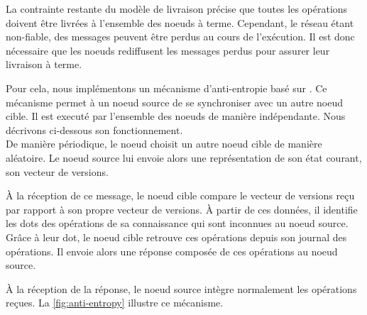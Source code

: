 \label{sec:mute-anti-entropy}

La contrainte restante du modèle de livraison précise que toutes les opérations doivent être livrées à l'ensemble des noeuds à terme.
Cependant, le réseau étant non-fiable, des messages peuvent être perdus au cours de l'exécution.
Il est donc nécessaire que les noeuds rediffusent les messages perdus pour assurer leur livraison à terme.

Pour cela, nous implémentons un mécanisme d'anti-entropie basé sur \cite{1983-anti-entropy-vv}.
Ce mécanisme permet à un noeud source de se synchroniser avec un autre noeud cible.
Il est executé par l'ensemble des noeuds de manière indépendante.
Nous décrivons ci-dessous son fonctionnement.\\

De manière périodique, le noeud choisit un autre noeud cible de manière aléatoire.
Le noeud source lui envoie alors une représentation de son état courant, \ie son vecteur de versions.

À la réception de ce message, le noeud cible compare le vecteur de versions reçu par rapport à son propre vecteur de versions.
À partir de ces données, il identifie les dots des opérations de sa connaissance qui sont inconnues au noeud source.
Grâce à leur dot, le noeud cible retrouve ces opérations depuis son journal des opérations.
Il envoie alors une réponse composée de ces opérations au noeud source.

À la réception de la réponse, le noeud source intègre normalement les opérations reçues.
La \autoref{fig:anti-entropy} illustre ce mécanisme.\\

